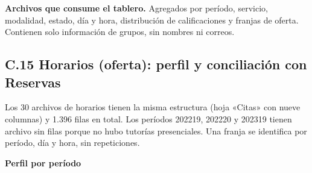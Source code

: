 \documentclass[11pt,letterpaper]{article}
\begin{document}
\textbf{Archivos que consume el tablero.} Agregados por período, servicio, modalidad, estado, día y hora, distribución de calificaciones y franjas de oferta. Contienen solo información de grupos, sin nombres ni correos.

\subsection*{C.15 Horarios (oferta): perfil y conciliación con Reservas}

Los 30 archivos de horarios tienen la misma estructura (hoja «Citas» con nueve columnas) y 1.396 filas en total. Los períodos 202219, 202220 y 202319 tienen archivo sin filas porque no hubo tutorías presenciales. Una franja se identifica por período, día y hora, sin repeticiones.

\textbf{Perfil por período}
\end{document}
